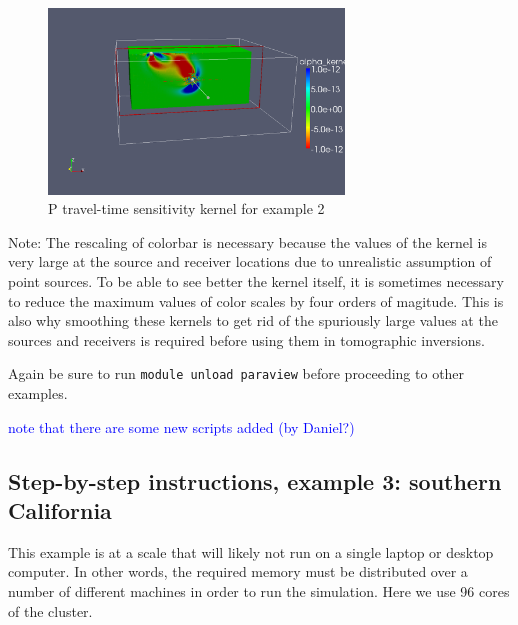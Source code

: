 \documentclass[10pt,fleqn,letterpaper]{article}
\newcommand{\blue}[1]{\textcolor{blue}{#1}}
\begin{document}
\begin{enumerate}
\begin{figure}[h]
\begin{center}
\includegraphics[width=0.7\textwidth]{homogeneous_halfspace_P_kernel.png}
\end{center}
\caption{P travel-time sensitivity kernel for example 2}
\end{figure}

 Note: The rescaling of colorbar is necessary because the values of the kernel is very large at the source and receiver locations due to unrealistic assumption of point sources. To be able to see better the kernel itself, it is sometimes necessary to reduce the maximum values of color scales by four orders of magitude. This is also why smoothing these kernels to get rid of the spuriously large values at the sources and receivers is required before using them in tomographic inversions.
   
Again be sure to run \lstinline{module unload paraview} before proceeding to other examples.

\end{enumerate}

\blue{note that there are some new scripts added (by Daniel?)}



\subsection*{Step-by-step instructions, example 3: southern California}

This example is at a scale that will likely not run on a single laptop or desktop computer. In other words, the required memory must be distributed over a number of different machines in order to run the simulation. Here we use 96 cores of the cluster.
\end{document}
